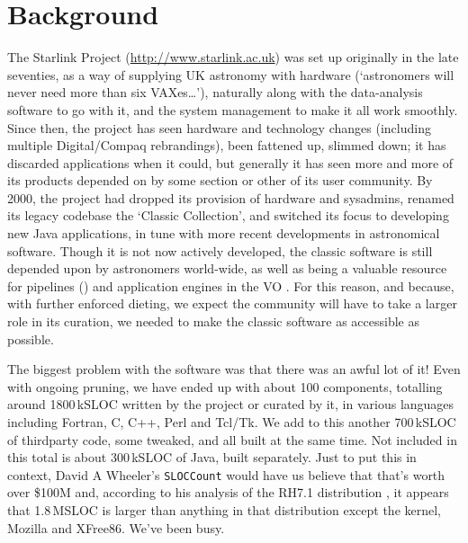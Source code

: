 \documentclass{speauth}
\begin{document}
\section{Background}
\label{s:background}


The Starlink Project (\url{http://www.starlink.ac.uk}) was set up
originally in the late seventies, as a way of supplying UK astronomy
with hardware (`astronomers will never need more than six
VAXes\dots'), naturally along with the data-analysis software to go
with it, and the system management to make it all work smoothly.
Since then, the project has seen hardware and technology changes
(including multiple Digital/Compaq rebrandings), been fattened up,
slimmed down; it has discarded applications when it could, but
generally it has seen more and more of its products depended on by
some section or other of its user community.  By 2000, the project had
dropped its provision of hardware and sysadmins, renamed its legacy
codebase the `Classic Collection', and switched its focus to
developing new Java applications, in tune with more recent
developments in astronomical software.  Though it is not now actively
developed, the classic software is still depended upon by astronomers
world-wide, as well as being a valuable resource for pipelines
(\cite{cavanagh03,currie04}) and application engines in the VO
\cite{giaretta05}.  For this reason, and because, with further
enforced dieting, we expect the community will have to take a larger
role in its curation, we needed to make the classic software as
accessible as possible.

The biggest problem with the software was that there was an awful lot
of it!  Even with ongoing pruning, we have ended up with about 100
components, totalling around 1800\,kSLOC written by the project or
curated by it, in various languages
including Fortran, C, C++, Perl and Tcl/Tk.  We add to this another
700\,kSLOC of thirdparty code, some tweaked, and all built at the same
time.  Not included in this total is about 300\,kSLOC of Java,
built separately.  Just to put this in context, David A
Wheeler's \texttt{SLOCCount} would have us believe that that's worth
over \$100M and, according to his analysis of the RH7.1 distribution
\cite{wheeler02}, it appears that 1.8\,MSLOC is larger than anything in
that distribution except the kernel, Mozilla and XFree86.  We've been busy.
\end{document}
